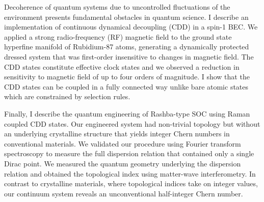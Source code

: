 Decoherence of quantum systems due to uncontrolled fluctuations of the environment presents fundamental obstacles in quantum science. I describe an implementation of continuous dynamical decoupling (CDD) in a spin-1 BEC. We applied a strong radio-frequency (RF) magnetic field to the ground state hyperfine manifold of Rubidium-87 atoms, generating a dynamically protected dressed system that was first-order insensitive to changes in magnetic field. The CDD states constitute effective clock states and we observed a reduction in sensitivity to magnetic field of up to four orders of magnitude. I show that the CDD states can be coupled in a fully connected way unlike bare atomic states which are constrained by selection rules. 

Finally, I describe the quantum engineering of Rashba-type SOC using Raman coupled CDD states. Our engineered system had non-trivial topology but without an underlying crystalline structure that yields integer Chern numbers in conventional materials. We validated our procedure using Fourier transform spectroscopy to measure the full dispersion relation that contained only a single Dirac point. We measured the quantum geometry underlying the dispersion relation and obtained the topological index using matter-wave interferometry. In contrast to crystalline materials, where topological indices take on integer values, our continuum system reveals an unconventional half-integer Chern number. 

